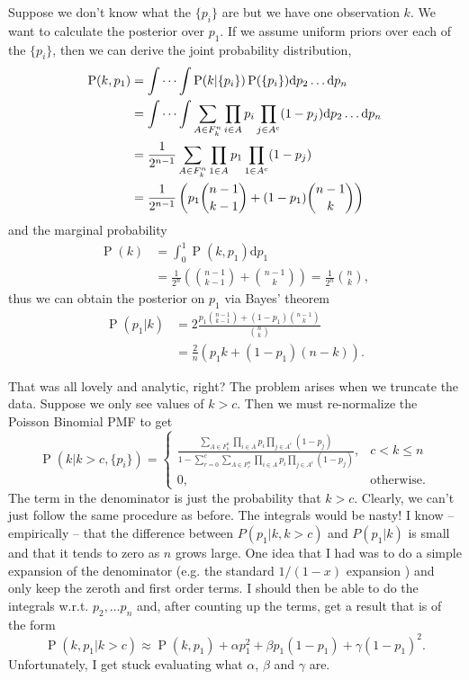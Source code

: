 \documentclass[fleqn,usenatbib]{mnras}
\begin{document}
Suppose we don't know what the $\{p_i\}$ are but we have one observation $k$. We want to calculate the posterior over $p_1$. If we assume uniform priors over each of the $\{p_i\}$, then we can derive the joint probability distribution,
\begin{align}
    \operatorname{P}(k,p_1) &= \idotsint \operatorname{P}(k|\{p_i\}) \operatorname{P}(\{p_i\})\mathrm{d}p_2 \dots \mathrm{d}p_n  \\
    &= \idotsint \sum_{A\in F_k^n} \prod_{i\in A} p_i \prod_{j\in A^{\mathrm{c}}} (1-p_j) \mathrm{d}p_2 \dots \mathrm{d}p_n \\
    &= \frac{1}{2^{n-1}} \sum_{A\in F_k^n} \prod_{1\in A} p_1 \prod_{1\in A^{\mathrm{c}}} (1-p_j) \\
    &= \frac{1}{2^{n-1}} \left( p_1 \binom{n-1}{k-1} + (1-p_1)\binom{n-1}{k} \right) \\
\end{align}
and the marginal probability
\begin{align}
    \operatorname{P}(k) &= \int_0^1 \operatorname{P}(k,p_1) \mathrm{d}p_1 \\
    &= \frac{1}{2^{n}}\left( \binom{n-1}{k-1} + \binom{n-1}{k} \right) = \frac{1}{2^{n}}\binom{n}{k},
\end{align}
thus we can obtain the posterior on $p_1$ via Bayes' theorem
\begin{align}
    \operatorname{P}(p_1|k) &= 2\frac{p_1 \binom{n-1}{k-1} + (1-p_1)\binom{n-1}{k}}{\binom{n}{k}} \\
    &= \frac{2}{n}\left(p_1k+(1-p_1)(n-k)\right).
\end{align}

That was all lovely and analytic, right? The problem arises when we truncate the data. Suppose we only see values of $k> c$. Then we must re-normalize the Poisson Binomial PMF to get
\begin{equation}
\operatorname{P}(k|k>c,\{p_i\}) = \begin{cases}
\frac{\sum_{A\in F_k^n} \prod_{i\in A} p_i \prod_{j\in A^{\mathrm{c}}} (1-p_j)}{1-\sum_{r=0}^{c}\sum_{A\in F_r^n} \prod_{i\in A} p_i \prod_{j\in A^{\mathrm{c}}} (1-p_j)}, & c<k\leq n \\
0, & \mathrm{otherwise}.
\end{cases}
\end{equation}
The term in the denominator is just the probability that $k>c$. Clearly, we can't just follow the same procedure as before. The integrals would be nasty! I know -- empirically -- that the difference between $P(p_1|k,k>c)$ and $P(p_1|k)$ is small and that it tends to zero as $n$ grows large. One idea that I had was to do a simple expansion of the denominator (e.g. the standard $1/(1-x)$ expansion ) and only keep the zeroth and first order terms. I should then be able to do the integrals w.r.t. $p_2,\dots p_n$ and, after counting up the terms, get a result that is of the form
\begin{equation}
    \operatorname{P}(k,p_1|k>c) \approx \operatorname{P}(k,p_1) + \alpha p_1^2 + \beta p_1(1-p_1) + \gamma (1-p_1)^2.
\end{equation}
Unfortunately, I get stuck evaluating what $\alpha$, $\beta$ and $\gamma$ are.
\end{document}
